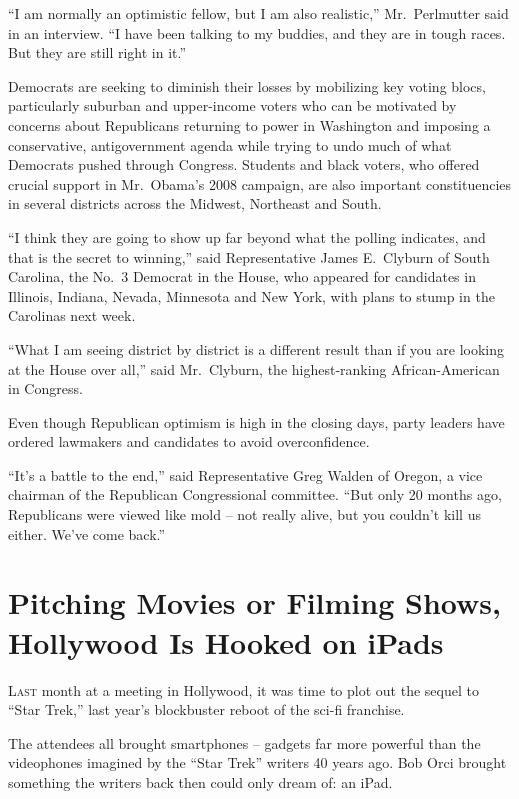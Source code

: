 ﻿\documentclass[12pt]{article}
\begin{document}
``I am normally an optimistic fellow, but I am also realistic,'' Mr.~Perlmutter said in an
interview. ``I have been talking to my buddies, and they are in tough races. But they are still
right in it.''

Democrats are seeking to diminish their losses by mobilizing key voting blocs, particularly suburban
and upper-income voters who can be motivated by concerns about Republicans returning to power in
Washington and imposing a conservative, antigovernment agenda while trying to undo much of what
Democrats pushed through Congress. Students and black voters, who offered crucial support in
Mr.~Obama's 2008 campaign, are also important constituencies in several districts across the
Midwest, Northeast and South.

``I think they are going to show up far beyond what the polling indicates, and that is the secret to
winning,'' said Representative James E.~Clyburn of South Carolina, the No.~3 Democrat in the House,
who appeared for candidates in Illinois, Indiana, Nevada, Minnesota and New York, with plans to
stump in the Carolinas next week.

``What I am seeing district by district is a different result than if you are looking at the House
over all,'' said Mr.~Clyburn, the highest-ranking African-American in Congress.

Even though Republican optimism is high in the closing days, party leaders have ordered lawmakers
and candidates to avoid overconfidence.

``It's a battle to the end,'' said Representative Greg Walden of Oregon, a vice chairman of the
Republican Congressional committee. ``But only 20 months ago, Republicans were viewed like mold --
not really alive, but you couldn't kill us either. We've come back.''

\section{Pitching Movies or Filming Shows, Hollywood Is Hooked on iPads}

\lettrine{L}{ast} month at a meeting in Hollywood, it was time to plot out
the sequel to ``Star Trek,'' last year's blockbuster reboot of the sci-fi franchise.

The attendees all brought smartphones -- gadgets far more powerful than the videophones imagined by
the ``Star Trek'' writers 40 years ago. Bob Orci brought something the writers back then could only
dream of: an iPad.
\end{document}
